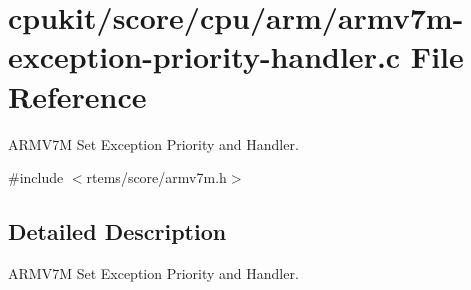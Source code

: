 \hypertarget{armv7m-exception-priority-handler_8c}{}\section{cpukit/score/cpu/arm/armv7m-\/exception-\/priority-\/handler.c File Reference}
\label{armv7m-exception-priority-handler_8c}


A\+R\+M\+V7M Set Exception Priority and Handler.  


{\ttfamily \#include $<$rtems/score/armv7m.\+h$>$}\newline


\subsection{Detailed Description}
A\+R\+M\+V7M Set Exception Priority and Handler. 

